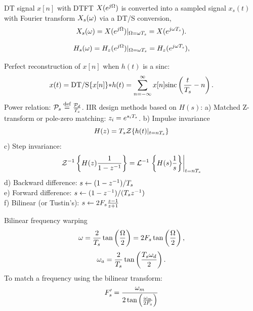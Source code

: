 DT signal $x[n]$ with DTFT $X(e^{j {\Omega}})$ is converted into a sampled 
signal $x_s(t)$ with Fourier transform $X_s({\omega})$ via a DT/S conversion, 
\begin{equation}
X_s({\omega})  = X(e^{j {\Omega}})|_{{\Omega} = {\omega} {T_s}} = X(e^{j {\omega} {T_s}}).
\label{eq:sampledSignalSpectrum}
\end{equation}

\begin{equation}
H_s({\omega})  = H_z(e^{j {\Omega}})|_{{\Omega} = {\omega} {T_s}} = H_z(e^{j {\omega} {T_s}}),
\label{eq:digitalFilterAndDC}
\end{equation}

Perfect reconstruction of $x[n]$ when $h(t)$ is a sinc:
\begin{equation}
 x(t) = \textrm{DT/S} \{ x[n] \} {\ast} h(t) = \sum_{n=-\infty}^\infty x[n] {\textrm{sinc}}\left( \frac{t}{{T_s}}-n \right).
\label{eq:signalReconstructionViaSincs2}
\end{equation}
Power relation:
${\cal P}_s \stackrel{\text{def}}{=} \frac{{\cal P}_d}{{T_s}}$.
IIR design methods based on $H(s)$:
a) Matched Z-transform or pole-zero matching: $z_i = e^{s_i {T_s}}$.
b) Impulse invariance
\begin{equation}
H(z) = {T_s} {\cal Z} \{ h(t)|_{t=n{T_s}}\}
\label{eq:impulseInvariant}
\end{equation}
c) Step invariance:
\begin{equation}
{\cal Z}^{-1} \left\{ H(z) \frac{1}{1-z^{-1}} \right\} = {\cal L}^{-1} \left. \left\{ H(s) \frac{1}{s} \right\} \right|_{t=n{T_s}}
\label{eq:stepInvariance}
\end{equation}
d) Backward difference:
$s \leftarrow (1-z^{-1})/{T_s}$
\\
e) Forward difference:
$s \leftarrow (1-z^{-1})/({T_s} z^{-1})$
\\
f) Bilinear (or Tustin's):
$s \leftarrow  2 {F_s} \frac{z-1}{z+1}$

Bilinear frequency warping
\begin{equation}
{\omega} = \frac{2}{{T_s}} \tan \left( \frac{{\Omega}}{2} \right) = 2 {F_s} \tan \left( \frac{{\Omega}}{2} \right),
\label{eq:prewarping}
\end{equation}
\begin{equation}
{\omega}_a = \frac{2}{{T_s}} \tan \left( \frac{{T_s} {\omega}_d}{2} \right).
\label{eq:prewarping2}
\end{equation}
To match a frequency using the bilinear transform:
\begin{equation}
F'_s =  \frac{{\omega}_m}{ 2\tan \left(  \frac{{\omega}_m}{2 {F_s}} \right) }
\end{equation}

